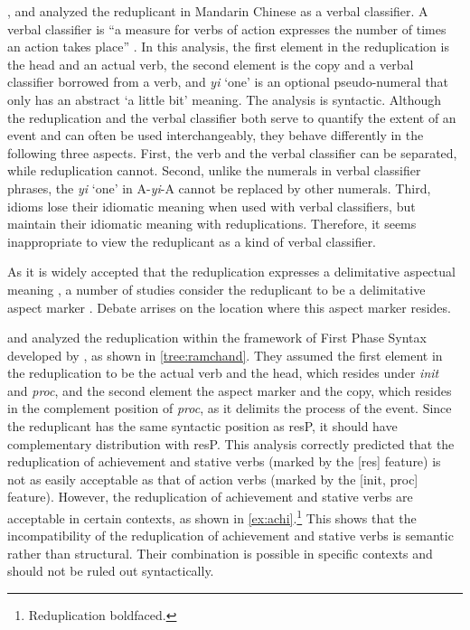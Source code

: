 \documentclass[
a4paper,
10pt,
oneside,
]{scrartcl}
\begin{document}
\citet{Chao1968}, \citet{Fan1964} and \citet{Xiong2016} analyzed the reduplicant in Mandarin Chinese
as a verbal classifier. A verbal classifier is ``a measure for verbs of action expresses the number
of times an action takes place” \citep[615]{Chao1968}. In this analysis, the first element in the
reduplication is the head and an actual verb, the second element is the copy and a verbal classifier
borrowed from a verb, and \emph{yi} `one' is an optional pseudo-numeral that only has an abstract `a
little bit' meaning. The analysis is syntactic. Although the reduplication and the verbal classifier
both serve to quantify the extent of an event and can often be used interchangeably, they behave
differently in the following three aspects. First, the verb and the verbal classifier can be
separated, while reduplication cannot. Second, unlike the numerals in verbal classifier phrases, the
\emph{yi} `one' in A-\emph{yi}-A cannot be replaced by other numerals. Third, idioms lose their
idiomatic meaning when used with verbal classifiers, but maintain their idiomatic meaning with
reduplications. Therefore, it seems inappropriate to view the reduplicant as a kind of verbal
classifier. 

As it is widely accepted that the reduplication expresses a delimitative aspectual meaning
\citep[e.g.][]{Chao1968, LiThompson1981, XiaoMcEnery2004}, a number of studies consider the
reduplicant to be a delimitative aspect marker \citep{Arcodiaetal2014, BascianoMelloni2017,
  YangWei2017}. Debate arrises on the location where this aspect marker resides. 

\citet{Arcodiaetal2014} and \citet{BascianoMelloni2017} analyzed the reduplication within the
framework of First Phase Syntax developed by \citet{Ramchand2008}, as shown in
\ref{tree:ramchand}. They assumed the first element in the reduplication to be the actual verb and
the head, which resides under \emph{init} and \emph{proc}, and the second element the aspect marker
and the copy, which resides in the complement position of \emph{proc}, as it delimits the process of
the event. Since the reduplicant has the same syntactic position as resP, it should have
complementary distribution with resP. This analysis correctly predicted that the reduplication of
achievement and stative verbs (marked by the [res] feature) is not as easily acceptable as that of
action verbs (marked by the [init, proc] feature). However, the reduplication of achievement and
stative verbs are acceptable in certain contexts, as shown in \ref{ex:achi}.\footnote{Reduplication
  boldfaced.} This shows that the incompatibility of the reduplication of achievement and stative
verbs is semantic rather than structural. Their combination is possible in specific contexts and
should not be ruled out syntactically. 
\end{document}
